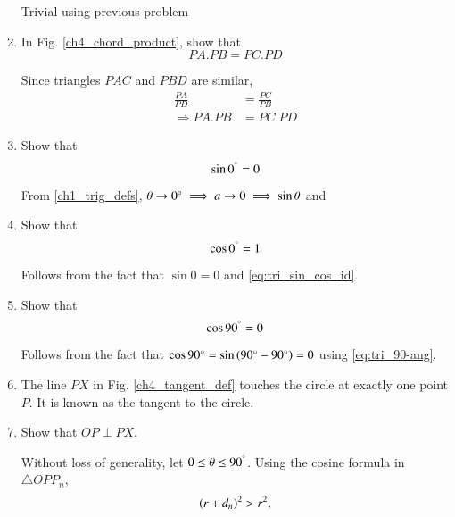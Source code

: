 \begin{enumerate}[label=\arabic*.,ref=\thesubsection.\theenumi]
\solution Trivial using previous problem
\item
	In Fig. \ref{ch4_chord_product}, show that 
	\begin{equation}
	PA.PB = PC.PD
	\end{equation}

%
\solution Since triangles $PAC$ and $PBD$ are similar, 
%
\begin{align}
\frac{PA}{PD} &= \frac{PC}{PB} \\
\Rightarrow PA.PB &= PC.PD
\end{align}
%
%
\item
	Show that 
	\begin{equation}
	\label{ch5_sin_zero}
	\sin 0^{\degree} = 0
	\end{equation}

\solution From \eqref{ch1_trig_defs}, $\theta \to 0\degree \implies a \to 0 \implies \sin \theta $ and %
\item
	Show that 
	\begin{equation}
	\label{ch5_cos_zero}
	\cos 0^{\degree} = 1
	\end{equation}

\solution Follows from the fact that $\sin 0 = 0$ and \eqref{eq:tri_sin_cos_id}.
% 	
\item
	Show that 
	\begin{equation}
	\label{ch5_cos_90}
	\cos 90^{\degree} = 0
	\end{equation}

\solution Follows from the fact that $\cos 90 \degree = \sin \left(90\degree -90\degree\right) = 0$ using \eqref{eq:tri_90-ang}.
\item
	The line $PX$ in Fig. \ref{ch4_tangent_def} touches the circle at exactly one  point $P$. It is known as the tangent to the circle.
%
%
\item
	Show that $OP \perp PX$.

\solution Without loss of generality, let $0 \le \theta \le 90^{\degree}$. Using the cosine formula in $\triangle OPP_n$,\begin{align}
\left(r+d_n\right)^2 > r^2,
\end{align}
%
\begin{figure}[!ht]
	\begin{center}
		

\end{center}
\end{figure}
\end{enumerate}
